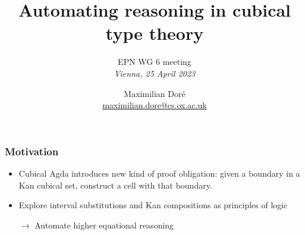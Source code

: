 \documentclass[xetex, mathserif, serif]{beamer}
\title{\hspace{-.7em}Automating reasoning in cubical type theory\vspace{1em}}
\subtitle{EPN WG 6 meeting\\\textit{Vienna, 25 April 2023}}
\author{Maximilian Dor\'e\\\url{maximilian.dore@cs.ox.ac.uk}} \date{}
\newcommand{\cset}[1]{\ensuremath{\mathsf{{#1}}}}
\begin{document}
\maketitle



\begin{frame}
  \frametitle{Motivation}

  \begin{itemize}
  \item Cubical Agda introduces new kind of proof obligation: given a boundary in a
    Kan cubical set, construct a cell with that boundary.
  \item Explore interval substitutions and Kan compositions as principles of
    logic

    $\to$ Automate higher equational reasoning 
  \end{itemize}

\end{frame}





\end{document}
